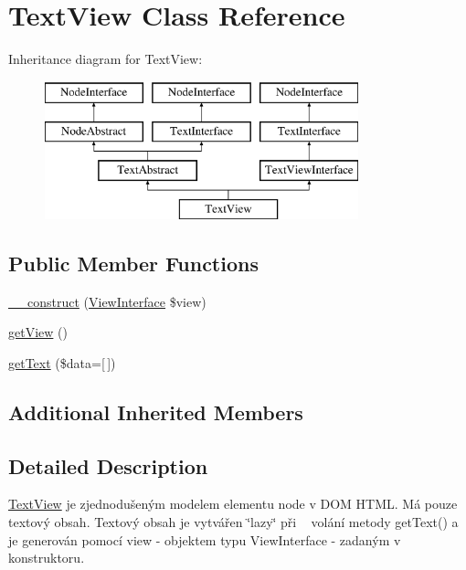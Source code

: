 \hypertarget{class_pes_1_1_dom_1_1_node_1_1_text_1_1_text_view}{}\section{Text\+View Class Reference}
\label{class_pes_1_1_dom_1_1_node_1_1_text_1_1_text_view}
Inheritance diagram for Text\+View\+:\begin{figure}[H]
\begin{center}
\leavevmode
\includegraphics[height=4.000000cm]{class_pes_1_1_dom_1_1_node_1_1_text_1_1_text_view}
\end{center}
\end{figure}
\subsection*{Public Member Functions}
\begin{DoxyCompactItemize}
\item 
\mbox{\hyperlink{class_pes_1_1_dom_1_1_node_1_1_text_1_1_text_view_a37f379cfd1340ce50b22a4c8e4b68a83}{\+\_\+\+\_\+construct}} (\mbox{\hyperlink{interface_pes_1_1_view_1_1_view_interface}{View\+Interface}} \$view)
\item 
\mbox{\hyperlink{class_pes_1_1_dom_1_1_node_1_1_text_1_1_text_view_a50677812ea3f0258f7d03bbac5265413}{get\+View}} ()
\item 
\mbox{\hyperlink{class_pes_1_1_dom_1_1_node_1_1_text_1_1_text_view_a7897d55e6d6983b1f2cfa7214eaed267}{get\+Text}} (\$data=\mbox{[}$\,$\mbox{]})
\end{DoxyCompactItemize}
\subsection*{Additional Inherited Members}


\subsection{Detailed Description}
\mbox{\hyperlink{class_pes_1_1_dom_1_1_node_1_1_text_1_1_text_view}{Text\+View}} je zjednodušeným modelem elementu node v D\+OM H\+T\+ML. Má pouze textový obsah. Textový obsah je vytvářen \char`\"{}lazy\char`\"{} při ~\newline
volání metody get\+Text() a je generován pomocí view -\/ objektem typu View\+Interface -\/ zadaným v konstruktoru.

